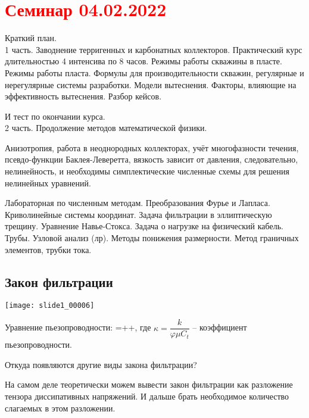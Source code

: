\documentclass[main.tex]{subfiles}
\begin{document}
\section{\textcolor{red}{Семинар 04.02.2022}}

Краткий план.\\

1 часть. Заводнение терригенных и карбонатных коллекторов. Практический курс длительностью 4 интенсива по 8 часов. Режимы работы скважины в пласте. Режимы работы пласта. Формулы для производительности скважин, регулярные и нерегулярные системы разработки. Модели вытеснения. Факторы, влияющие на эффективность вытеснения. Разбор кейсов.

И тест по окончании курса.\\

2 часть. Продолжение методов математической физики.

Анизотропия, работа в неоднородных коллекторах, учёт многофазности течения, псевдо-функции Баклея-Леверетта, вязкость зависит от давления, следовательно, нелинейность, и необходимы симплектические численные схемы для решения нелинейных уравнений.

Лабораторная по численным методам. Преобразования Фурье и Лапласа. Криволинейные системы координат. Задача фильтрации в эллиптическую трещину. Уравнение Навье-Стокса. Задача о нагрузке на физический кабель. Трубы. Узловой анализ (лр). Методы понижения размерности. Метод граничных элементов, трубки тока.



\subsection{Закон фильтрации}
\texttt{[image: slide1\_00006]}

Уравнение пьезопроводности:
\beq
{}=++,
\eeq
где $\kappa=\dfrac{k}{\varphi\mu C_t}$ -- коэффициент пьезопроводности.


Откуда появляются другие виды закона фильтрации?

На самом деле теоретически можем вывести закон фильтрации как разложение тензора диссипативных напряжений. И дальше брать необходимое количество слагаемых в этом разложении.\\
\end{document}
